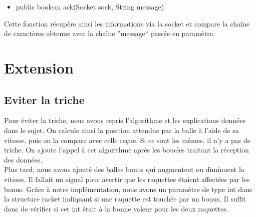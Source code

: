 \begin{itemize}
 \item public boolean ack(Socket sock, String message)
\end{itemize}

Cette fonction récupère ainsi les informations via la socket et compare la chaîne de caractères obtenue avec la chaîne 
''message`` passée en paramètre.

\section{Extension}

\subsection{Eviter la triche}
Pour éviter la triche, nous avons repris l'algorithme et les explications données dans le sujet. 
On calcule ainsi la position attendue par la balle à l'aide de sa vitesse, puis on 
la compare avec celle reçue. Si ce sont les mêmes, il n'y a pas de triche.
On ajoute l'appel à cet algorithme après les boucles traitant la réception des données.
\\
Plus tard, nous avons ajouté des balles bonus qui augmentent ou diminuent la vitesse. 
Il fallait un signal pour avertir que les raquettes
étaient affectées par les bonus. Grâce à notre implémentation, nous avons un paramètre de type int dans 
la structure racket indiquant si une 
raquette est touchée par un bonus. Il suffit donc de vérifier si cet int était à la bonne valeur pour les deux raquettes.

